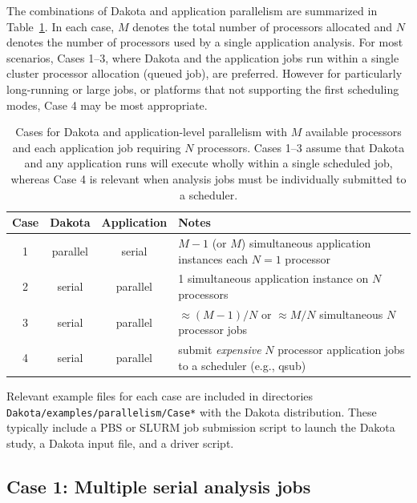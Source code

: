 The combinations of Dakota and application parallelism are summarized
in Table~\ref{parallel:application:table01}.  In each case, $M$
denotes the total number of processors allocated and $N$ denotes the
number of processors used by a single application analysis.  For most
scenarios, Cases 1--3, where Dakota and the application jobs run
within a single cluster processor allocation (queued job), are
preferred.  However for particularly long-running or large jobs, or
platforms that not supporting the first scheduling modes, Case 4 may
be most appropriate.
\begin{table}
  \centering
  \caption{Cases for Dakota and application-level parallelism with $M$
  available processors and each application job requiring $N$
  processors.  Cases 1--3 assume that Dakota and any application runs
  will execute wholly within a single scheduled job, whereas Case 4 is
  relevant when analysis jobs must be individually submitted to a
  scheduler.}
  \label{parallel:application:table01}\vspace{2mm}
  \begin{tabular}{c|c|c|l}
    {\bf Case} & {\bf Dakota} & {\bf Application} & {\bf Notes} \\
    \hline 1 & parallel & serial & $M-1$ (or $M$) simultaneous
    application instances each $N=1$ processor \\ 2 & serial &
    parallel & 1 simultaneous application instance on $N$ processors
    \\ 3 & serial & parallel & $\approx (M-1)/N$ or $\approx M/N$
    simultaneous $N$ processor jobs \\ 4 & serial & parallel & submit
    {\em expensive} $N$ processor application jobs to a scheduler
    (e.g., qsub) \\ \hline
  \end{tabular}
\end{table}

Relevant example files for each case are included in directories {\tt
Dakota/examples/parallelism/Case*} with the Dakota distribution.
These typically include a PBS or SLURM job submission script to launch
the Dakota study, a Dakota input file, and a driver script.

\subsection{Case 1: Multiple serial analysis jobs}

